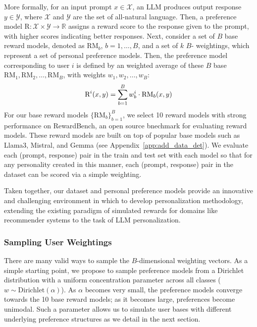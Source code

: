 More formally, for an input prompt $x \in \mathcal{X}$, an LLM produces output response $y \in \mathcal{Y}$, where $\mathcal{X}$ and $\mathcal{Y}$ are the set of all-natural language.  Then, a preference model $\text{R}: \mathcal{X} \times \mathcal{Y} \rightarrow \mathbb{R}$ assigns a reward score to the response given to the prompt, with higher scores indicating better responses.  
Next, consider a set of $B$ base reward models, denoted as $\text{RM}_b$, $b=1,\dots,B$, and a set of $k$ $B$- weightings, which represent a set of personal preference models.  
Then, the preference model corresponding to user $i$ is defined by an weighted average of these $B$ base $\text{RM}_1, \text{RM}_2,\dots, \text{RM}_{B}$, with weights $w_1, w_2,\dots, w_B$:
\begin{align}
\vspace{-3pt}
    \text{R}^i(x,y) = \sum_{b=1}^{B} w^i_{b}\cdot\text{RM}_b(x,y)
\vspace{-3pt}
\end{align}
For our base reward models $\{\text{RM}_b\}_{b=1}^B$, we select 10 reward models with strong performance on RewardBench, an open source bnechmark for evaluating reward models.  
These reward models are built on top of popular base models such as Llama3, Mistral, and Gemma (see Appendix~\ref{app:add_data_det}).  
We evaluate each (prompt, response) pair in the train and test set with each model so that for any personality created in this manner, each (prompt, response) pair in the dataset can be scored via a simple weighting.

Taken together, our dataset and personal preference models provide an innovative and challenging environment in which to develop personalization methodology, extending the existing paradigm of simulated rewards for domains like recommender systems \citep{zhao2023kuaisimcomprehensivesimulatorrecommender, ie2019recsimconfigurablesimulationplatform} to the task of LLM personalization.


\subsubsection{Sampling User Weightings}
There are many valid ways to sample the $B$-dimensional weighting vectors.  As a simple starting point, we propose to sample preference models from a Dirichlet distribution with a uniform concentration parameter across all classes ($w \sim \text{Dirichlet}(\alpha)$).  
As $\alpha$ becomes very small, the preference models converge towards the 10 base reward models; as it becomes large, preferences become unimodal.  Such a parameter allows us to simulate user bases with different underlying preference structures as we detail in the next section.



